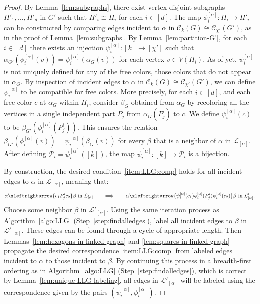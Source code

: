 \documentclass{amsart}
\theoremstyle{hypothesisstyle}
\theoremstyle{definition}
\theoremstyle{remark}
\numberwithin{equation}{section}
\begin{document}
\begin{proof}
By Lemma~\ref{lem:subgraphs}, there exist vertex-disjoint subgraphs $H'_1, \dots, H'_d$ in $G'$ such that $H'_i\cong H_i$ for each $i\in [d]$. The map $\phi_i^{[\alpha]}\colon H_i\to H'_{i}$ can be constructed by comparing edges incident to $\alpha$ in $\mathcal{C}_{k}(G)\cong \mathcal{C}_{\chi'}(G')$, as in the proof of Lemma~\ref{lem:subgraphs}. By Lemma~\ref{lem:partition-G'}, for each $i\in[d]$ there exists an injection $\psi_i^{[\alpha]}\colon [k]\to [\chi']$ such that $\alpha_{G'}(\phi_i^{[\alpha]}(v))=\psi_i^{[\alpha]}\left(\alpha_G(v)\right)$ for each vertex $v\in V(H_i)$. As of yet, $\psi_i^{[\alpha]}$ is not uniquely defined for any of the free colors, those colors that do not appear in $\alpha_G$.  
By inspection of incident edges to $\alpha$ in $\mathcal{C}_{k}(G)\cong \mathcal{C}_{\chi'}(G')$, we can define $\psi_i^{[\alpha]}$ to be compatible for free colors. More precisely, for each $i\in [d]$, and each free color $c$ at $\alpha_G$ within $H_i$, consider $\beta_{G}$ obtained from $\alpha_{G}$ by recoloring all the vertices in a single independent part $P_j^{i}$ from $\alpha_{G}(P_{j}^{i})$ to $c$. We define $\psi_{i}^{[\alpha]}(c)$ to be $\beta_{G'}(\phi_i^{[\alpha]}(P_{j}^{i}))$. This ensures the relation $\beta_{G'}(\phi_i^{[\alpha]}(v))=\psi_i^{[\alpha]}\left(\beta_G(v)\right)$ for every $\beta$ that is a neighbor of $\alpha$ in $\mathcal{L}_{[\alpha]}$. After defining $\mathcal{P}_{i} = \psi_i^{[\alpha]}([k])$, the map $\psi_{i}^{[\alpha]}\colon [k]\to \mathcal{P}_i$ is a bijection. 

By construction, the desired condition~\eqref{item:LLG:comp} holds for all incident edges to $\alpha$ in $\mathcal{L}_{[\alpha]}$, meaning that:
$$
\alpha\xleftrightarrow{c_1 P^i_{j}c_2} \beta \text{ in } \mathcal{L}_{[\alpha]}  \quad\quad \Longrightarrow \quad\quad \alpha\xleftrightarrow{\psi_i^{[\alpha]}(c_1) \phi_i^{[\alpha]}(P^i_{j})\psi_i^{[\alpha]}(c_2)} \beta \text{ in } \mathcal{L}'_{[\alpha]}.
$$
Choose some neighbor $\beta$ in $\mathcal{L}'_{[\alpha]}$.  Using the same iteration process as Algorithm~\ref{algo:LLG} (Step~\ref{step:findalledges}), label all incident edges to $\beta$ in $\mathcal{L}'_{[\alpha]}$. These edges can be found through a cycle of appropriate length. Then Lemmas~\ref{lem:hexagons-in-linked-graph} and \ref{lem:squares-in-linked-graph} propagate the desired correspondence \eqref{item:LLG:comp} from labeled edges incident to $\alpha$ to those incident to $\beta$.
By continuing this process in a breadth-first ordering as in Algorithm~\ref{algo:LLG} (Step~\ref{step:findalledges}), which is correct by Lemma~\ref{lem:unique-LLG-labeling}, all edges in $\mathcal{L}'_{[\alpha]}$ will be labeled using the correspondence given by the pairs $(\psi_i^{[\alpha]}, \phi_i^{[\alpha]})$.
\end{proof}
\end{document}
